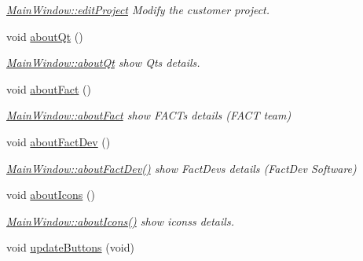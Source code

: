 \begin{DoxyCompactItemize}
\begin{DoxyCompactList}\small\item\em \hyperlink{classGui_1_1MainWindow_adade8f873eb855b2ca0bb851c91cc5a9}{Main\+Window\+::edit\+Project} Modify the customer project. \end{DoxyCompactList}\item 
\hypertarget{classGui_1_1MainWindow_a6df8072789ea8ec81ca2dd8fa78a4b01}{}void \hyperlink{classGui_1_1MainWindow_a6df8072789ea8ec81ca2dd8fa78a4b01}{about\+Qt} ()\label{classGui_1_1MainWindow_a6df8072789ea8ec81ca2dd8fa78a4b01}

\begin{DoxyCompactList}\small\item\em \hyperlink{classGui_1_1MainWindow_a6df8072789ea8ec81ca2dd8fa78a4b01}{Main\+Window\+::about\+Qt} show Qt\textquotesingle{}s details. \end{DoxyCompactList}\item 
\hypertarget{classGui_1_1MainWindow_a26726203b873f41f607d78c5d5619c7d}{}void \hyperlink{classGui_1_1MainWindow_a26726203b873f41f607d78c5d5619c7d}{about\+Fact} ()\label{classGui_1_1MainWindow_a26726203b873f41f607d78c5d5619c7d}

\begin{DoxyCompactList}\small\item\em \hyperlink{classGui_1_1MainWindow_a26726203b873f41f607d78c5d5619c7d}{Main\+Window\+::about\+Fact} show F\+A\+C\+T\textquotesingle{}s details (F\+A\+C\+T team) \end{DoxyCompactList}\item 
\hypertarget{classGui_1_1MainWindow_a39fe49fec47b6cbe4c8664d97bc47e0f}{}void \hyperlink{classGui_1_1MainWindow_a39fe49fec47b6cbe4c8664d97bc47e0f}{about\+Fact\+Dev} ()\label{classGui_1_1MainWindow_a39fe49fec47b6cbe4c8664d97bc47e0f}

\begin{DoxyCompactList}\small\item\em \hyperlink{classGui_1_1MainWindow_a39fe49fec47b6cbe4c8664d97bc47e0f}{Main\+Window\+::about\+Fact\+Dev()} show Fact\+Dev\textquotesingle{}s details (Fact\+Dev Software) \end{DoxyCompactList}\item 
\hypertarget{classGui_1_1MainWindow_a56db09003bd79c8635488d0edc57cdb3}{}void \hyperlink{classGui_1_1MainWindow_a56db09003bd79c8635488d0edc57cdb3}{about\+Icons} ()\label{classGui_1_1MainWindow_a56db09003bd79c8635488d0edc57cdb3}

\begin{DoxyCompactList}\small\item\em \hyperlink{classGui_1_1MainWindow_a56db09003bd79c8635488d0edc57cdb3}{Main\+Window\+::about\+Icons()} show icons\textquotesingle{}s details. \end{DoxyCompactList}\item 
\hypertarget{classGui_1_1MainWindow_ac71b4c99f67e10b31d9855e80a9565b7}{}void \hyperlink{classGui_1_1MainWindow_ac71b4c99f67e10b31d9855e80a9565b7}{update\+Buttons} (void)\label{classGui_1_1MainWindow_ac71b4c99f67e10b31d9855e80a9565b7}


\end{DoxyCompactItemize}
